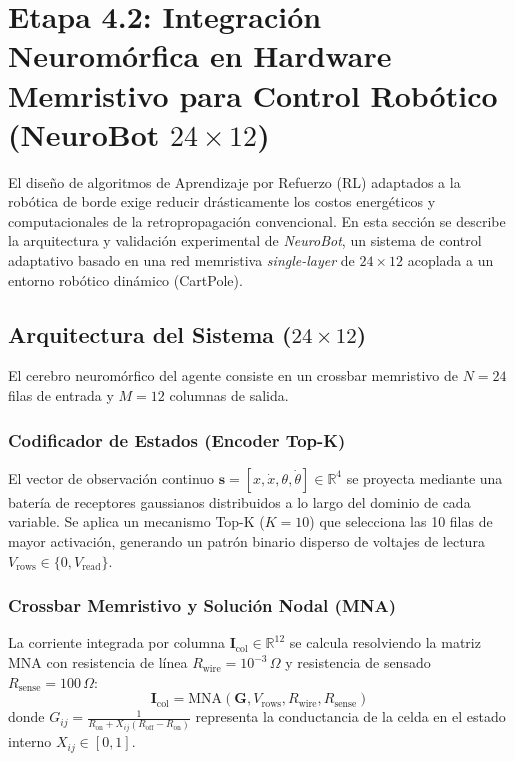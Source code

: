 \section{Etapa 4.2: Integración Neuromórfica en Hardware Memristivo para Control Robótico (NeuroBot $24 \times 12$)}
\label{sec:etapa4_2}

El diseño de algoritmos de Aprendizaje por Refuerzo (RL) adaptados a la robótica de borde exige reducir drásticamente los costos energéticos y computacionales de la retropropagación convencional. En esta sección se describe la arquitectura y validación experimental de \textit{NeuroBot}, un sistema de control adaptativo basado en una red memristiva \textit{single-layer} de $24 \times 12$ acoplada a un entorno robótico dinámico (CartPole).

\subsection{Arquitectura del Sistema ($24 \times 12$)}
El cerebro neuromórfico del agente consiste en un crossbar memristivo de $N=24$ filas de entrada y $M=12$ columnas de salida.

\subsubsection{Codificador de Estados (Encoder Top-K)}
El vector de observación continuo $\mathbf{s} = [x, \dot{x}, \theta, \dot{\theta}] \in \mathbb{R}^4$ se proyecta mediante una batería de receptores gaussianos distribuidos a lo largo del dominio de cada variable. Se aplica un mecanismo Top-K ($K=10$) que selecciona las 10 filas de mayor activación, generando un patrón binario disperso de voltajes de lectura $V_{\text{rows}} \in \{0, V_{\text{read}}\}$.

\subsubsection{Crossbar Memristivo y Solución Nodal (MNA)}
La corriente integrada por columna $\mathbf{I}_{\text{col}} \in \mathbb{R}^{12}$ se calcula resolviendo la matriz MNA con resistencia de línea $R_{\text{wire}} = 10^{-3}\,\Omega$ y resistencia de sensado $R_{\text{sense}} = 100\,\Omega$:
\begin{equation}
    \mathbf{I}_{\text{col}} = \text{MNA}(\mathbf{G}, V_{\text{rows}}, R_{\text{wire}}, R_{\text{sense}})
\end{equation}
donde $G_{ij} = \frac{1}{R_{\text{on}} + X_{ij}(R_{\text{off}} - R_{\text{on}})}$ representa la conductancia de la celda en el estado interno $X_{ij} \in [0, 1]$.

